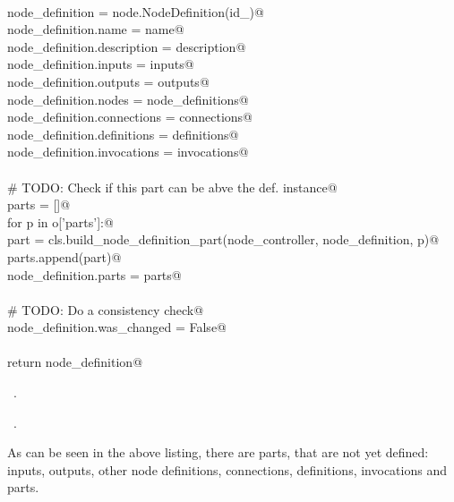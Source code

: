 \documentclass[
    a4paper,      %
    10pt,         %
    openright,    %
    notitlepage,  %
    parskip=half, %
]{scrreprt}       %
\theoremstyle{definition}                    %
\begin{document}
\begin{flushleft}
\begin{minipage}{\linewidth}
\begin{list}{}{}
\mbox{}\lstinline@@\\
\mbox{}\lstinline@    node_definition             = node.NodeDefinition(id_)@\\
\mbox{}\lstinline@    node_definition.name        = name@\\
\mbox{}\lstinline@    node_definition.description = description@\\
\mbox{}\lstinline@    node_definition.inputs      = inputs@\\
\mbox{}\lstinline@    node_definition.outputs     = outputs@\\
\mbox{}\lstinline@    node_definition.nodes       = node_definitions@\\
\mbox{}\lstinline@    node_definition.connections = connections@\\
\mbox{}\lstinline@    node_definition.definitions = definitions@\\
\mbox{}\lstinline@    node_definition.invocations = invocations@\\
\mbox{}\lstinline@@\\
\mbox{}\lstinline@    # TODO: Check if this part can be abve the def. instance@\\
\mbox{}\lstinline@    parts = []@\\
\mbox{}\lstinline@    for p in o['parts']:@\\
\mbox{}\lstinline@        part = cls.build_node_definition_part(node_controller, node_definition, p)@\\
\mbox{}\lstinline@        parts.append(part)@\\
\mbox{}\lstinline@    node_definition.parts = parts@\\
\mbox{}\lstinline@@\\
\mbox{}\lstinline@    # TODO: Do a consistency check@\\
\mbox{}\lstinline@    node_definition.was_changed = False@\\
\mbox{}\lstinline@@\\
\mbox{}\lstinline@    return node_definition@{\NWsep}
\end{list}
\vspace{-1.5ex}
\footnotesize
\begin{list}{}{\setlength{\itemsep}{-\parsep}\setlength{\itemindent}{-\leftmargin}}
\item \NWtxtMacroDefBy\ .
\item \NWtxtMacroRefIn\ .

\item{}
\end{list}
\end{minipage}\vspace{4ex}
\end{flushleft}
As can be seen in the above listing, there are parts, that are not yet defined:
inputs, outputs, other node definitions, connections, definitions, invocations
and parts.
\end{document}
